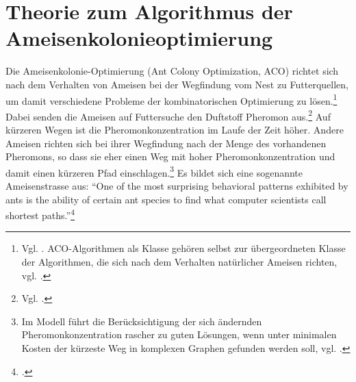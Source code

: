 \section{Theorie zum Algorithmus der Ameisenkolonieoptimierung}

Die Ameisenkolonie-Optimierung (Ant Colony Optimization, ACO) richtet sich nach
dem Verhalten von Ameisen bei der Wegfindung vom Nest zu Futterquellen, um damit
verschiedene Probleme der kombinatorischen Optimierung zu lösen.\footnote{Vgl.
\citet*[S. 1]{sch-koa}. ACO-Algorithmen als Klasse gehören selbst zur
übergeordneten Klasse der Algorithmen, die sich nach dem Verhalten natürlicher
Ameisen richten, vgl. \citet*[S. 22]{ds-ant}.} Dabei senden die Ameisen auf
Futtersuche den Duftstoff Pheromon aus.\footnote{Vgl. \citet*[S.
1\,ff.]{ds-ant}.} Auf kürzeren Wegen ist die Pheromonkonzentration im Laufe der
Zeit höher. Andere Ameisen richten sich bei ihrer Wegfindung nach der Menge des
vorhandenen Pheromons, so dass sie eher einen Weg mit hoher
Pheromonkonzentration und damit einen kürzeren Pfad einschlagen.\footnote{Im
Modell führt die Berücksichtigung der sich ändernden Pheromonkonzentration
rascher zu guten Lösungen, wenn unter minimalen Kosten der kürzeste Weg in
komplexen Graphen gefunden werden soll, vgl. \citet*[S. 9\,ff.; 22]{ds-ant}.} Es
bildet sich eine sogenannte Ameisenstrasse aus: \enquote{One of the most
surprising behavioral patterns exhibited by ants is the ability of certain ant
species to find what computer scientists call shortest
paths.}\footnote{\citet*[S. IX]{ds-ant}.}


